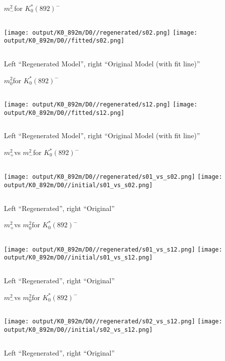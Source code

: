 \documentclass{beamer}
\newcommand{\MP}{\ensuremath{m^2_+}}
\newcommand{\MM}{\ensuremath{m^2_-}}
\newcommand{\MZ}{\ensuremath{m^2_0}}
\begin{document}
\begin{frame}{\MM for $K_0^*(892)^-$}
\begin{columns}[t]
\centering
\texttt{[image: output/K0\_892m/D0//regenerated/s02.png]}
\centering
\texttt{[image: output/K0\_892m/D0//fitted/s02.png]}
\end{columns}
    \centering
    Left ``Regenerated Model'', right ``Original Model (with fit line)''
\end{frame}                   

\begin{frame}{\MZ for $K_0^*(892)^-$}
\begin{columns}[t]
\centering
\texttt{[image: output/K0\_892m/D0//regenerated/s12.png]}
\centering
\texttt{[image: output/K0\_892m/D0//fitted/s12.png]}
\end{columns}
    \centering
    Left ``Regenerated Model'', right ``Original Model (with fit line)''
\end{frame}                   


\begin{frame}{\MP vs \MM for $K_0^*(892)^-$}
\begin{columns}[t]
\centering
\texttt{[image: output/K0\_892m/D0//regenerated/s01\_vs\_s02.png]}
\centering
\texttt{[image: output/K0\_892m/D0//initial/s01\_vs\_s02.png]}
\end{columns}
    \centering
    Left ``Regenerated'', right ``Original''
\end{frame} 


\begin{frame}{\MP vs \MZ for $K_0^*(892)^-$}
\begin{columns}[t]
\centering
\texttt{[image: output/K0\_892m/D0//regenerated/s01\_vs\_s12.png]}
\centering
\texttt{[image: output/K0\_892m/D0//initial/s01\_vs\_s12.png]}
\end{columns}
    \centering
    Left ``Regenerated'', right ``Original''
\end{frame} 


\begin{frame}{\MM vs \MZ for $K_0^*(892)^-$}
\begin{columns}[t]
\centering
\texttt{[image: output/K0\_892m/D0//regenerated/s02\_vs\_s12.png]}
\centering
\texttt{[image: output/K0\_892m/D0//initial/s02\_vs\_s12.png]}
\end{columns}
    \centering
    Left ``Regenerated'', right ``Original''
\end{frame} 
\end{document}
